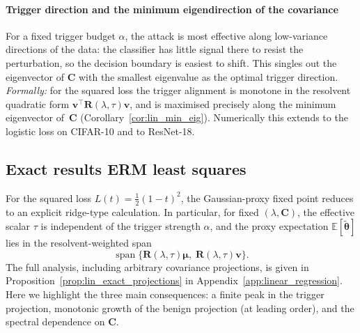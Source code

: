 \documentclass[11pt]{article}
\newcommand{\EE}{\mathbb{E}}
\newcommand{\C}{\mathbf{C}}
\newcommand{\bv}{\mathbf{v}}
\newcommand{\bmu}{\boldsymbol{\mu}}
\newcommand{\btheta}{\boldsymbol{\theta}}
\begin{document}
\paragraph{Trigger direction and the minimum eigendirection of the covariance}
\label{sec:trigger_eigen}

For a fixed trigger budget $\alpha$, the attack is most effective along low-variance directions of the data: the classifier has little signal there to resist the perturbation, so the decision boundary is easiest to shift. This singles out the eigenvector of $\C$ with the smallest eigenvalue as the optimal trigger direction. 
\emph{Formally:} for the squared loss the trigger alignment is monotone in the resolvent quadratic form $\bv^\top \mathbf{R}(\lambda,\tau)\bv$, and is maximised precisely along the minimum eigenvector of~$\C$ (Corollary~\ref{cor:lin_min_eig}).
Numerically this extends to the logistic loss on CIFAR-10 and to ResNet-18.



\subsection{Exact results ERM least squares}
\label{sec:exact}

For the squared loss \(L(t)=\frac12(1-t)^2\), the Gaussian-proxy fixed point
reduces to an explicit ridge-type calculation. In particular, for fixed
\((\lambda,\C)\), the effective scalar \(\tau\) is independent of the trigger
strength \(\alpha\), and the proxy expectation \(\EE[\tilde{\btheta}]\) lies in the
resolvent-weighted span
\[
\operatorname{span}\{\mathbf{R}(\lambda,\tau)\bmu,\;\mathbf{R}(\lambda,\tau)\bv\}.
\]
The full analysis, including arbitrary covariance projections, is given in Proposition~\ref{prop:lin_exact_projections} in Appendix~\ref{app:linear_regression}. Here we highlight the three main consequences: a finite peak in the trigger projection, monotonic growth of the benign projection (at leading order), and the spectral dependence on \(\C\).
\end{document}
